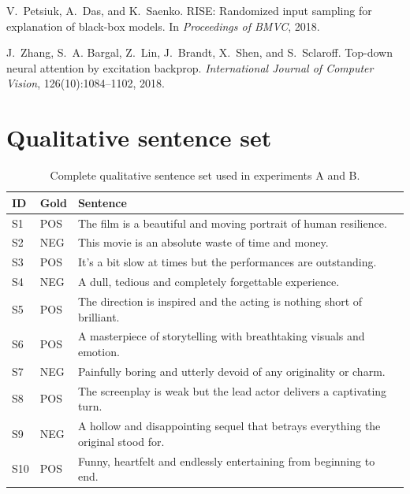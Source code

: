 \documentclass[11pt,a4paper]{article}
\begin{document}
\begin{thebibliography}{99}
V.~Petsiuk, A.~Das, and K.~Saenko.
RISE: Randomized input sampling for explanation of black-box models.
In \emph{Proceedings of BMVC}, 2018.

J.~Zhang, S.~A. Bargal, Z.~Lin, J.~Brandt, X.~Shen, and S.~Sclaroff.
Top-down neural attention by excitation backprop.
\emph{International Journal of Computer Vision}, 126(10):1084--1102, 2018.

\end{thebibliography}

\clearpage
\appendix

\section{Qualitative sentence set}\label{app:sentences}

\begin{table}[H]
  \centering
  \caption{Complete qualitative sentence set used in experiments A and B.}
  \label{tab:sentences}
  \small
  \begin{tabularx}{\textwidth}{@{}l l Y@{}}
    \toprule
    ID & Gold & Sentence \\
    \midrule
    S1  & POS & The film is a beautiful and moving portrait of human resilience. \\
    S2  & NEG & This movie is an absolute waste of time and money. \\
    S3  & POS & It's a bit slow at times but the performances are outstanding. \\
    S4  & NEG & A dull, tedious and completely forgettable experience. \\
    S5  & POS & The direction is inspired and the acting is nothing short of brilliant. \\
    S6  & POS & A masterpiece of storytelling with breathtaking visuals and emotion. \\
    S7  & NEG & Painfully boring and utterly devoid of any originality or charm. \\
    S8  & POS & The screenplay is weak but the lead actor delivers a captivating turn. \\
    S9  & NEG & A hollow and disappointing sequel that betrays everything the original stood for. \\
    S10 & POS & Funny, heartfelt and endlessly entertaining from beginning to end. \\
    \bottomrule
  \end{tabularx}
\end{table}
\end{document}

